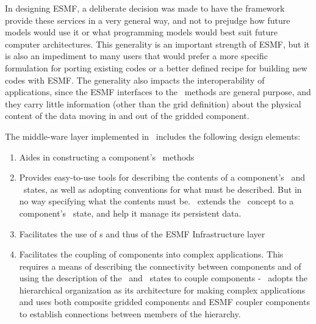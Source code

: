 In designing ESMF, a deliberate decision was made to have the
framework provide these services in a very general way, and not to
prejudge how future models would use it or what programming models
would best suit future computer architectures. This generality is an
important strength of ESMF, but it is also an impediment to many users
that would prefer a more specific formulation for porting existing
codes or a better defined recipe for building new codes with ESMF. The
generality also impacts the interoperability of applications, since
the ESMF interfaces to the \IRF\ methods are general purpose, and they
carry little information (other than the grid definition) about the
physical content of the data moving in and out of the gridded
component.

The middle-ware layer implemented in \ggn\  includes the following
design elements:
%
\begin{enumerate}
%
\item Aides in constructing a component's \IRF\ methods

\item Provides easy-to-use tools for describing the contents of a
  component's \im\ and \ex\ states, as well as adopting conventions for what
  must be described. But in no way specifying what the contents must be.
  \ggn\ extends the \stt\  concept to a component's \gin\ state, and
  help it manage its persistent data.
  
\item Facilitates the use of \fld s and thus of the ESMF 
  Infrastructure layer

\item Facilitates the coupling of components into complex applications. This
  requires a means of describing the connectivity between components and
  of using the description of the \im\ and \ex\ states to couple
  components - \ggn\ adopts the hierarchical organization as its
  architecture for making complex applications and uses both composite
  gridded components and ESMF coupler components to establish connections
  between members of the hierarchy.
\end{enumerate}




